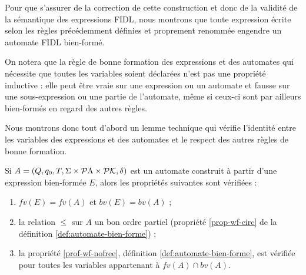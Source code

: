 Pour que s'assurer de la correction de cette construction et donc de
la validit\'e de la s\'emantique des expressions  \textsf{FIDL},
nous montrons que toute expression \'ecrite selon les r\`egles
pr\'ec\'edemment d\'efinies et proprement renomm\'ee engendre un
automate \textsf{FIDL} bien-form\'e.

On notera que la r\`egle de bonne formation des expressions et des
automates qui n\'ecessite que toutes les variables soient
d\'eclar\'ees n'est pas une propri\'et\'e inductive : elle peut
\^etre vraie sur une expression ou un automate et fausse sur une
sous-expression ou une partie de l'automate, m\^eme si ceux-ci sont
par ailleurs bien-form\'es en regard des autres r\`egles. 

Nous montrons donc tout d'abord un lemme technique qui v\'erifie
l'identit\'e entre les variables des expressions et des automates et
le respect des autres r\`egles de bonne formation.

\begin{lemma}
    \label{lem:exp-auto}
    Si $A=(Q, q_0,T,\Sigma\times{}{\cal P}\Lambda\times{}{\cal P}\mathcal{K},
    \delta)$ est un automate construit \`a partir d'une expression
    bien-form\'ee $E$,  alors les propri\'et\'es suivantes sont
    v\'erifi\'ees :
    \begin{enumerate}
      \item $fv(E) = fv(A)$ et $bv(E) = bv(A)$ ;
      \item la relation $\leq$ sur $A$ un bon ordre partiel (propri\'et\'e
        \ref{prop-wf-circ} de la d\'efinition \ref{def:automate-bien-forme}) ;
      \item  la propri\'et\'e \ref{prof-wf-nofree}, d\'efinition
      \ref{def:automate-bien-forme}, est v\'erifi\'ee pour toutes
      les variables appartenant \`a $fv(A) \cap bv(A)$.
    \end{enumerate}
\end{lemma}

